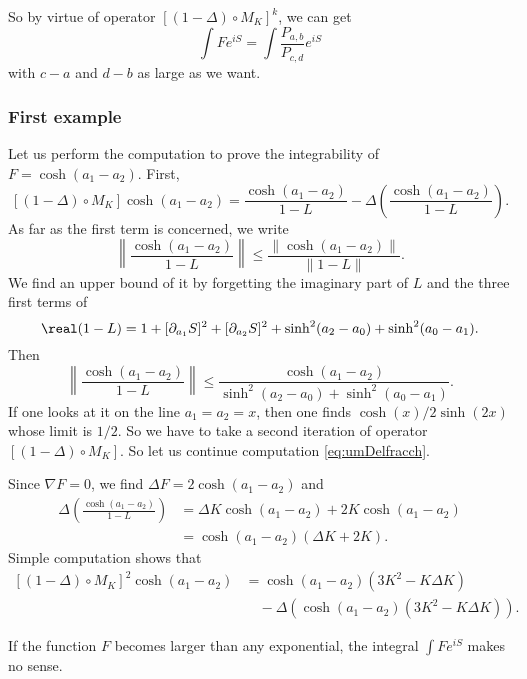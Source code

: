 So by virtue of operator $[(1-\Delta)\circ M_K]^k$, we can get
\begin{equation}
	\int F  e^{iS}=\int \frac{P_{a,b}}{P_{c,d}} e^{iS}
\end{equation}
with $c-a$ and $d-b$ as large as we want.

\subsubsection{First example}

Let us perform the computation to prove the integrability of $F=\cosh(a_1-a_2)$. First,
\begin{equation}  \label{eq:umDelfracch}
	[(1-\Delta)\circ M_K]\cosh(a_1-a_2)=\frac{\cosh(a_1-a_2)}{1-L}-\Delta\left( \frac{\cosh(a_1-a_2)}{1-L} \right).
\end{equation}
As far as the first term is concerned, we write
\[
	\left\|  \frac{\cosh(a_1-a_2)}{1-L}  \right\|\leq \frac{\| \cosh(a_1-a_2) \|}{\| 1-L \|}.
\]
We find an upper bound of it by forgetting the imaginary part of $L$ and the three first terms of
\[
	\real(1-L)=1+[\partial_{a_1}S]^2+[\partial_{a_2}S]^2+\sinh^2(a_2-a_0)+\sinh^2(a_0-a_1).
\]
Then
\[
	\left\| \frac{\cosh(a_1-a_2)}{1-L}\right\|\leq \frac{\cosh(a_1-a_2)}{\sinh^2(a_2-a_0)+\sinh^2(a_0-a_1)}.
\]
If one looks at it on the line $a_1=a_2=x$, then one finds $\cosh(x)/2\sinh(2x)$ whose limit is $1/2$. So we have to take a second iteration of operator $[(1-\Delta)\circ M_K]$. So let us continue computation \eqref{eq:umDelfracch}.

Since $\nabla F=0$, we find $\Delta F=2\cosh(a_1-a_2)$ and
\begin{equation}
	\begin{split}
		\Delta\left( \frac{\cosh(a_1-a_2)}{1-L} \right)&=\Delta K \cosh(a_1-a_2)+2K\cosh(a_1-a_2)\\
		&=\cosh(a_1-a_2)(\Delta K+2K).
	\end{split}
\end{equation}
Simple computation shows that
\begin{equation}
	\begin{split}
		[(1-\Delta)\circ M_K]^2\cosh(a_1-a_2)&=\cosh(a_1-a_2)(3K^2-K\Delta K)\\
		&\quad-\Delta(\cosh(a_1-a_2)(3K^2-K\Delta K)).
	\end{split}
\end{equation}

\begin{lemma}
	If the function $F$ becomes larger than any exponential, the integral $\int F e^{iS}$ makes no sense.
\end{lemma}

